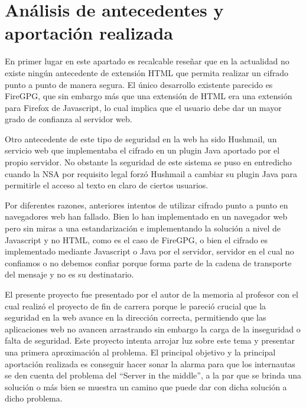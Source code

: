 \chapter{Análisis de antecedentes y aportación realizada}\label{antecedentes}

En primer lugar en este apartado es recalcable reseñar que en la actualidad no existe ningún antecedente de extensión HTML que permita realizar un cifrado punto a punto de manera segura. El único desarrollo existente parecido es FireGPG, que sin embargo más que una extensión de HTML era una extensión para Firefox de Javascript, lo cual implica que el usuario debe dar un mayor grado de confianza al servidor web.

Otro antecedente de este tipo de seguridad en la web ha sido Hushmail, un servicio web que implementaba el cifrado en un plugin Java aportado por el propio servidor. No obstante la seguridad de este sistema se puso en entredicho cuando la NSA \cite{thehushmailreport} por requisito legal forzó Hushmail a cambiar su plugin Java para permitirle el acceso al texto en claro de ciertos usuarios.

Por diferentes razones, anteriores intentos de utilizar cifrado punto a punto en navegadores web han fallado. Bien lo han implementado en un navegador web pero sin miras a una estandarización e implementando la solución a nivel de Javascript y no HTML, como es el caso de FireGPG, o bien el cifrado es implementado mediante Javascript o Java por el servidor, servidor en el cual no confiamos o no debemos confiar porque forma parte de la cadena de transporte del mensaje y no es su destinatario.

El presente proyecto fue presentado por el autor de la memoria al profesor con el cual realizó el proyecto de fin de carrera porque le pareció crucial que la seguridad en la web avance en la dirección correcta, permitiendo que las aplicaciones web no avancen arrastrando sin embargo la carga de la inseguridad o falta de seguridad. Este proyecto intenta arrojar luz sobre este tema y presentar una primera aproximación al problema. El principal objetivo y la principal aportación realizada es conseguir hacer sonar la alarma para que los internautas se den cuenta del problema del ``Server in the middle'', a la par que se brinda una solución o más bien se muestra un camino que puede dar con dicha solución a dicho problema.

